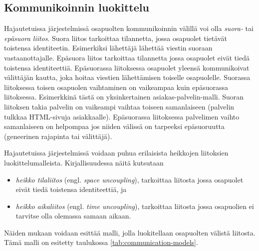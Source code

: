 \subsection{Kommunikoinnin luokittelu}
\label{ch:liitokset}
Hajautetuissa järjestelmissä osapuolten kommunikoinnin välillä voi olla \emph{suora-} tai \emph{epäsuora liitos}. Suora liitos tarkoittaa tilannetta, jossa osapuolet tietävät toistensa identiteetin. Esimerkiksi lähettäjä lähettää viestin suoraan vastaanottajalle. Epäsuora liitos tarkoittaa tilannetta jossa osapuolet eivät tiedä toistensa identiteettiä. Epäsuorassa liitoksessa osapuolet yleensä kommunikoivat välittäjän kautta, joka hoitaa viestien lähettämisen toiselle osapuolelle. Suorassa liitoksessa toisen osapuolen vaihtaminen on vaikeampaa kuin epäsuorassa liitoksessa. Esimerkkinä tästä on yksinkertainen asiakas-palvelin-malli. Suoran liitoksen takia palvelin on vaikeampi vaihtaa toiseen samanlaiseen (palvelin tulkkaa HTML-sivuja asiakkaalle). Epäsuorassa liitoksessa palvelimen vaihto samanlaiseen on helpompaa jos niiden välissä on tarpeeksi epäsuoruutta (geneerinen rajapinta tai välittäjä). \cite[s.~230]{distributed-systems-concepts-and-design}

Hajautetuissa järjestelmissä voidaan puhua erilaisista heikkojen liitoksien luokittelumalleista. Kirjallisuudessa näitä kutsutaan
\begin{itemize}
	\item \emph{heikko tilaliitos} (engl. \emph{space uncoupling}), tarkoittaa liitosta jossa osapuolet eivät tiedä toistensa identiteettiä, ja
	\item \emph{heikko aikaliitos} (engl. \emph{time uncoupling}), tarkoittaa liitosta jossa osapuolien ei tarvitse olla olemassa samaan aikaan.
\end{itemize}
Näiden mukaan voidaan esittää malli, jolla luokitellaan osapuolten välistä liitosta. Tämä malli on esitetty taulukossa \ref{tab:communication-models}. \cite[s.~230]{distributed-systems-concepts-and-design} \cite[s.~116]{eugster2003many}

